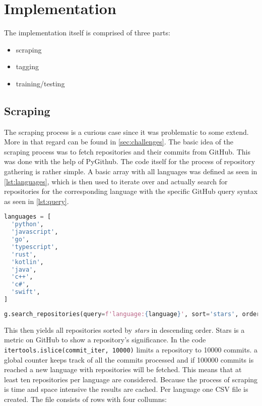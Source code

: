 \section{Implementation}
\label{sec:implementation}

The implementation itself is comprised of three parts:

\begin{itemize}
  \item scraping
  \item tagging
  \item training/testing
\end{itemize}

\subsection{Scraping}

The scraping process is a curious case since it was problematic to some extend.
More in that regard can be found in \autoref{sec:challenges}.  The basic idea
of the scraping process was to fetch repositories and their commits from
GitHub.  This was done with the help of PyGithub. The code itself for the
process of repository gathering is rather simple. A basic array with all
languages was defined as seen in \autoref{lst:languages}, which is then used to
iterate over and actually search for repositories for the corresponding language
with the specific GitHub query syntax as seen in \autoref{lst:query}.

\begin{lstlisting}[language=python, label={lst:languages}, caption={Array of all languages for scraping}]
languages = [
  'python',
  'javascript',
  'go',
  'typescript',
  'rust',
  'kotlin',
  'java',
  'c++',
  'c#',
  'swift',
]
\end{lstlisting}

\begin{lstlisting}[language=python, label={lst:query}, caption={GitHub query syntax}]
g.search_repositories(query=f'language:{language}', sort='stars', order='desc'):
\end{lstlisting}

This then yields all repositories sorted by \textit{stars} in descending order.
Stars is a metric on GitHub to show a repository's significance. In the code
\lstinline{itertools.islice(commit_iter, 10000)} limits a repository to 10000
commits. a global counter keeps track of all the commits processed and if
100000 commits is reached a new language with repositories will be fetched.
This means that at least ten repositories per language are considered.  Because
the process of scraping is time and space intensive the results are cached. Per
language one CSV file is created. The file consists of rows with four collumns:

